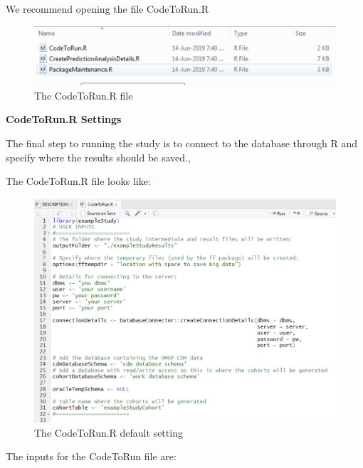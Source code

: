 \documentclass[11pt]{book}
\begin{document}
We recommend opening the file CodeToRun.R

\begin{figure}
\includegraphics[width=1\linewidth]{images/PatientLevelPrediction/atlasImplementation/code_to_run} \caption{The CodeToRun.R file}\label{fig:figureU18}
\end{figure}

\textbf{CodeToRun.R Settings}

The final step to running the study is to connect to the database
through R and specify where the results should be saved.,

The CodeToRun.R file looks like:

\begin{figure}
\includegraphics[width=1\linewidth]{images/PatientLevelPrediction/atlasImplementation/code_to_run_open} \caption{The CodeToRun.R default setting}\label{fig:figureU19}
\end{figure}

The inputs for the CodeToRun file are:
\end{document}
